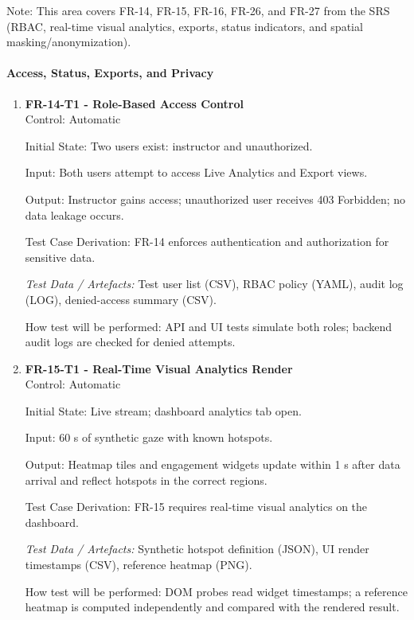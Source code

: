 \documentclass[12pt, titlepage]{article}
\begin{document}
Note: This area covers FR-14, FR-15, FR-16, FR-26, and FR-27 from the SRS (RBAC, real-time visual analytics, exports, status indicators, and spatial masking/anonymization).

\paragraph{Access, Status, Exports, and Privacy}

\begin{enumerate}

\item \textbf{FR-14-T1 - Role-Based Access Control} \\

Control: Automatic

Initial State: Two users exist: instructor and unauthorized.

Input: Both users attempt to access Live Analytics and Export views.

Output: Instructor gains access; unauthorized user receives 403 Forbidden; no data leakage occurs.

Test Case Derivation: FR-14 enforces authentication and authorization for sensitive data.

\textit{Test Data / Artefacts:} Test user list (CSV), RBAC policy (YAML), audit log (LOG), denied-access summary (CSV).

How test will be performed: API and UI tests simulate both roles; backend audit logs are checked for denied attempts.

\item \textbf{FR-15-T1 - Real-Time Visual Analytics Render} \\

Control: Automatic

Initial State: Live stream; dashboard analytics tab open.

Input: 60 s of synthetic gaze with known hotspots.

Output: Heatmap tiles and engagement widgets update within 1 s after data arrival and reflect hotspots in the correct regions.

Test Case Derivation: FR-15 requires real-time visual analytics on the dashboard.

\textit{Test Data / Artefacts:} Synthetic hotspot definition (JSON), UI render timestamps (CSV), reference heatmap (PNG).

How test will be performed: DOM probes read widget timestamps; a reference heatmap is computed independently and compared with the rendered result.


\end{enumerate}
\end{document}
